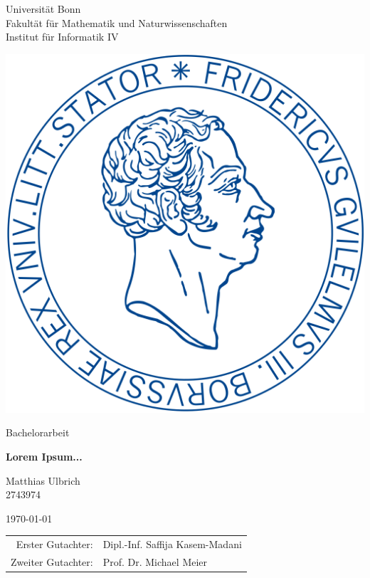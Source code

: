\documentclass[12pt,a4paper]{scrartcl}	%
\begin{document}
	
\begin{titlepage}
\begin{center}
		\large
		Universität Bonn \\
		Fakultät für Mathematik und Naturwissenschaften \\
	    Institut für Informatik IV \\
		\vspace*{1 cm} 
			
		\includegraphics[scale=0.11]{UniBonnSiegel.png}{\centering}
		\vspace*{3 cm}  
			
		{\selectfont
			\Large
			Bachelorarbeit
			\vspace*{0.5cm}
				
			\LARGE 
				\textbf{Lorem Ipsum... 💭}
			\vspace*{3 cm}       
		}
			
		Matthias Ulbrich \\  
		2743974
		\vspace{1 cm}
			
		\today
		\vspace*{1 cm}
			
		\begin{tabular}{rl}
			Erster Gutachter:  &Dipl.-Inf. Saffija Kasem-Madani \\
			Zweiter Gutachter: &Prof. Dr. Michael Meier
		\end{tabular}
		
	\end{center}
\end{titlepage}	
\end{document}
